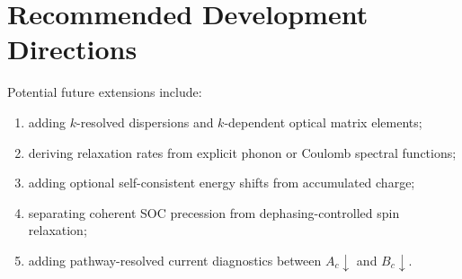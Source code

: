 \documentclass[11pt,a4paper]{article}
\begin{document}
\section{Recommended Development Directions}

Potential future extensions include:
\begin{enumerate}[leftmargin=2em]
  \item adding $k$-resolved dispersions and $k$-dependent optical matrix elements;
  \item deriving relaxation rates from explicit phonon or Coulomb spectral functions;
  \item adding optional self-consistent energy shifts from accumulated charge;
  \item separating coherent SOC precession from dephasing-controlled spin relaxation;
  \item adding pathway-resolved current diagnostics between $A_c\downarrow$ and $B_c\downarrow$.
\end{enumerate}
\end{document}
